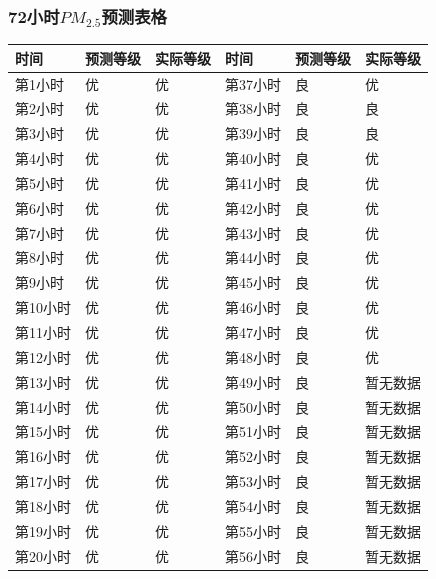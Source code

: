 \documentclass[UTF8]{ctexart}
\begin{document}
\subsubsection{72小时$PM_{2.5}$预测表格}
\begin{table}[H]
    \centering
    \begin{tabular}{|l|l|l|l|l|l|}
        \hline
        时间    & 预测等级 & 实际等级 & 时间    & 预测等级 & 实际等级 \\ \hline
        第1小时  & 优    & 优    & 第37小时 & 良    & 优    \\ \hline
        第2小时  & 优    & 优    & 第38小时 & 良    & 良    \\ \hline
        第3小时  & 优    & 优    & 第39小时 & 良    & 良    \\ \hline
        第4小时  & 优    & 优    & 第40小时 & 良    & 优    \\ \hline
        第5小时  & 优    & 优    & 第41小时 & 良    & 优    \\ \hline
        第6小时  & 优    & 优    & 第42小时 & 良    & 优    \\ \hline
        第7小时  & 优    & 优    & 第43小时 & 良    & 优    \\ \hline
        第8小时  & 优    & 优    & 第44小时 & 良    & 优    \\ \hline
        第9小时  & 优    & 优    & 第45小时 & 良    & 优    \\ \hline
        第10小时 & 优    & 优    & 第46小时 & 良    & 优    \\ \hline
        第11小时 & 优    & 优    & 第47小时 & 良    & 优    \\ \hline
        第12小时 & 优    & 优    & 第48小时 & 良    & 优    \\ \hline
        第13小时 & 优    & 优    & 第49小时 & 良    & 暂无数据 \\ \hline
        第14小时 & 优    & 优    & 第50小时 & 良    & 暂无数据 \\ \hline
        第15小时 & 优    & 优    & 第51小时 & 良    & 暂无数据 \\ \hline
        第16小时 & 优    & 优    & 第52小时 & 良    & 暂无数据 \\ \hline
        第17小时 & 优    & 优    & 第53小时 & 良    & 暂无数据 \\ \hline
        第18小时 & 优    & 优    & 第54小时 & 良    & 暂无数据 \\ \hline
        第19小时 & 优    & 优    & 第55小时 & 良    & 暂无数据 \\ \hline
        第20小时 & 优    & 优    & 第56小时 & 良    & 暂无数据 \\ \hline

\end{tabular}
\end{table}
\end{document}
